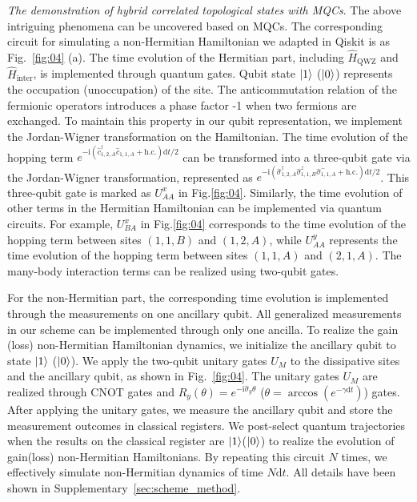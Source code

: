\documentclass[longbibliography, aps, prx, amsmath, amssymb, amsfonts, twocolumn,superscriptaddress, footinbib]{revtex4-1}
\begin{document}
    
	\textit{The demonstration of hybrid correlated topological states with MQCs}.
	The above intriguing phenomena can be uncovered based on MQCs. The corresponding circuit for simulating a non-Hermitian Hamiltonian we adapted in Qiskit is as Fig.~\ref{fig:04} (a). The time evolution of the Hermitian part, including $\hat{H}_{\text{QWZ}}$ and $\hat{H}_{\text{inter}}$, is implemented through quantum gates. 
	Qubit state $\ket{1}$ ($\ket{0}$) represents the occupation (unoccupation) of the site. 
	The anticommutation relation of the fermionic operators introduces a phase factor -1 when two fermions are exchanged. To maintain this property in our qubit representation, we implement the Jordan-Wigner transformation on the Hamiltonian.
    The time evolution of the hopping term $e^{-\mathrm{i} (\hat{c}_{1,2,A}^{\dagger} \hat{c}_{1,1,A} + \text{h.c.})\mathrm{d} t/2}$ can be transformed into a three-qubit gate via the Jordan-Wigner transformation, represented as $e^{-\mathrm{i} (\hat{\sigma}_{1,2,A}^{\dagger} \hat{\sigma}^z_{1,1,B}\hat{\sigma}_{1,1,A}^{-} + \text{h.c.})\mathrm{d} t/2}$. This three-qubit gate is marked as $U_{AA}^x$ in Fig.\ref{fig:04}. Similarly, the time evolution of other terms in the Hermitian Hamiltonian can be implemented via quantum circuits. For example, $U_{BA}^x$ in Fig.\ref{fig:04} corresponds to the time evolution of the hopping term between sites $(1,1,B)$ and $(1,2,A)$, while $U_{AA}^y$ represents the time evolution of the hopping term between sites $(1,1,A)$ and $(2,1,A)$. The many-body interaction terms can be realized using two-qubit gates.

	For the non-Hermitian part, the corresponding time evolution is implemented through the measurements on one ancillary qubit. 
	All generalized measurements in our scheme can be implemented through only one ancilla. To realize the gain (loss) non-Hermitian Hamiltonian dynamics, we initialize the ancillary qubit to state $\ket{1}$ ($\ket{0}$). We apply the two-qubit unitary gates $U_M$ to the dissipative sites and the ancillary qubit, as shown in Fig.~\ref{fig:04}. The unitary gates $U_M$ are realized through CNOT gates and $R_y(\theta) = e^{-\mathrm{i} \hat{\sigma}_y \theta}$ ($\theta = \arccos(e^{-\gamma \mathrm{d}t})$) gates.
	After applying the unitary gates, we measure the ancillary qubit and store the measurement outcomes in classical registers. 
	We post-select quantum trajectories when the results on the classical register are $\ket{1}$($\ket{0}$) to realize the evolution of gain(loss) non-Hermitian Hamiltonians. By repeating this circuit $N$ times, we effectively simulate non-Hermitian dynamics of time $N\mathrm{d}t$. All details have been shown in Supplementary~\ref{sec:scheme_method}.
\end{document}
